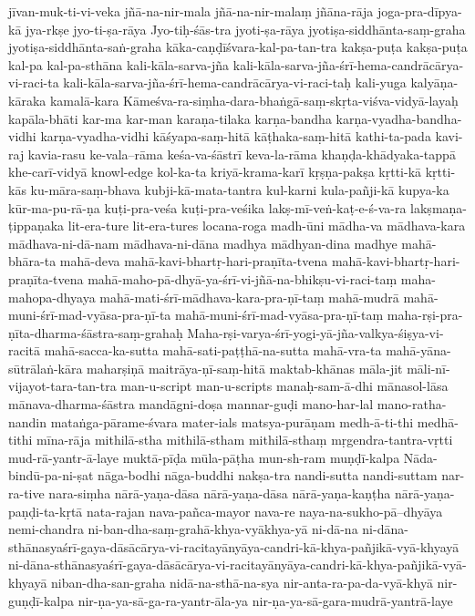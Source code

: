 {jīvan-muk-ti-vi-veka
jñā-na-nir-mala
jñā-na-nir-malaṃ
jñāna-rāja
joga-pra-dīpya-kā
jya-rkṣe
jyo-ti-ṣa-rāya
Jyo-tiḥ-śās-tra
jyoti-ṣa-rāya
jyotiṣa-siddhānta-saṃ-graha
jyotiṣa-siddhānta-saṅ-graha
kāka-caṇḍīśvara-kal-pa-tan-tra
kakṣa-puṭa
kakṣa-puṭa
kal-pa
kal-pa-sthāna
kali-kāla-sarva-jña
kali-kāla-sarva-jña-śrī-hema-candrācārya-vi-raci-ta
kali-kāla-sarva-jña-śrī-hema-candrācārya-vi-raci-taḥ
kali-yuga
kalyāṇa-kāraka
kamalā-kara
Kāmeśva-ra-siṃha-dara-bhaṅgā-saṃ-skṛta-viśva-vidyā-layaḥ
kapāla-bhāti
kar-ma
kar-man
karaṇa-tilaka
karṇa-bandha
karṇa-vyadha-bandha-vidhi
karṇa-vyadha-vidhi
kāśyapa-saṃ-hitā
kāṭhaka-saṃ-hitā
kathi-ta-pada
kavi-raj
kavia-rasu
ke-vala--rāma
keśa-va-śāstrī
keva-la-rāma
khaṇḍa-khādyaka-tappā
khe-carī-vidyā
knowl-edge
kol-ka-ta
kriyā-krama-karī
kṛṣṇa-pakṣa
kṛtti-kā
kṛtti-kās
ku-māra-saṃ-bhava
kubji-kā-mata-tantra
kul-karni
kula-pañji-kā
kupya-ka
kūr-ma-pu-rā-ṇa
kuṭi-pra-veśa
kuṭi-pra-veśika
lakṣ-mī-veṅ-kaṭ-e-ś-va-ra
lakṣmaṇa-ṭippaṇaka
lit-era-ture
lit-era-tures
locana-roga
madh-ūni
mādha-va
mādhava-kara
mādhava-ni-dā-nam
mādhava-ni-dāna
madhya
mādhyan-dina
madhye
mahā-bhāra-ta
mahā-deva
mahā-kavi-bhartṛ-hari-praṇīta-tvena
mahā-kavi-bhartṛ-hari-praṇīta-tvena
mahā-maho-pā-dhyā-ya-śrī-vi-jñā-na-bhikṣu-vi-raci-taṃ
maha-mahopa-dhyaya
mahā-mati-śrī-mādhava-kara-pra-ṇī-taṃ
mahā-mudrā
mahā-muni-śrī-mad-vyāsa-pra-ṇī-ta
mahā-muni-śrī-mad-vyāsa-pra-ṇī-taṃ
maha-rṣi-pra-ṇīta-dharma-śāstra-saṃ-grahaḥ
Maha-rṣi-varya-śrī-yogi-yā-jña-valkya-śiṣya-vi-racitā
mahā-sacca-ka-sutta
mahā-sati-paṭṭhā-na-sutta
mahā-vra-ta
mahā-yāna-sūtrālaṅ-kāra
maharṣiṇā
maitrāya-ṇī-saṃ-hitā
maktab-khānas
māla-jit
māli-nī-vijayot-tara-tan-tra
man-u-script
man-u-scripts
manaḥ-sam-ā-dhi
mānasol-lāsa
mānava-dharma-śāstra
mandāgni-doṣa
mannar-guḍi
mano-har-lal
mano-ratha-nandin
mataṅga-pārame-śvara
mater-ials
matsya-purāṇam
medh-ā-ti-thi
medhā-tithi
mīna-rāja
mithilā-stha
mithilā-stham
mithilā-sthaṃ
mṛgendra-tantra-vṛtti
mud-rā-yantr-ā-laye
muktā-pīḍa
mūla-pāṭha
mun-sh-ram
muṇḍī-kalpa
Nāda-bindū-pa-ni-ṣat
nāga-bodhi
nāga-buddhi
nakṣa-tra
nandi-sutta
nandi-suttam
nar-ra-tive
nara-siṃha
nārā-yaṇa-dāsa
nārā-yaṇa-dāsa
nārā-yaṇa-kaṇṭha
nārā-yaṇa-paṇḍi-ta-kṛtā
nata-rajan
nava-pañca-mayor
nava-re
naya-na-sukho-pā--dhyāya
nemi-chandra
ni-ban-dha-saṃ-grahā-khya-vyākhya-yā
ni-dā-na
ni-dāna-sthānasyaśrī-gaya-dāsācārya-vi-racitayānyāya-candri-kā-khya-pañjikā-vyā-khyayā
ni-dāna-sthānasyaśrī-gaya-dāsācārya-vi-racitayānyāya-candri-kā-khya-pañjikā-vyā-khyayā
niban-dha-san-graha
nidā-na-sthā-na-sya
nir-anta-ra-pa-da-vyā-khyā
nir-guṇḍī-kalpa
nir-ṇa-ya-sā-ga-ra-yantr-āla-ya
nir-ṇa-ya-sā-gara-mudrā-yantrā-laye
}
